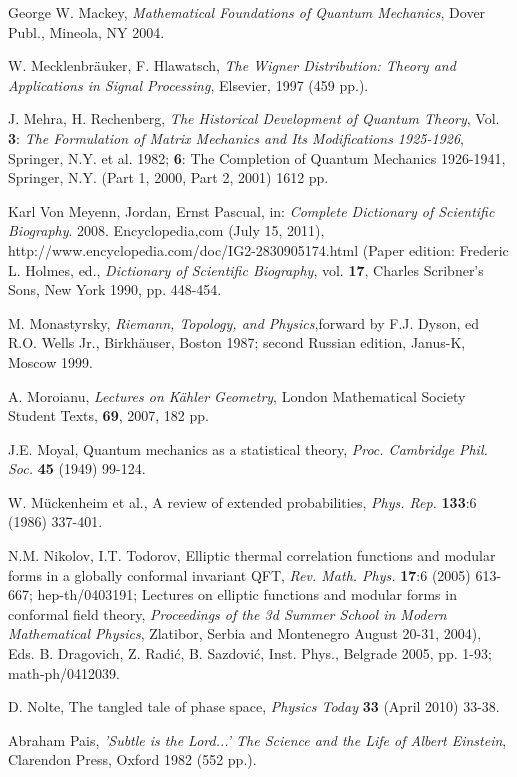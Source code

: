 \begin{thebibliography}{000}
 George W. Mackey, {\it Mathematical Foundations of Quantum Mechanics},
Dover Publ., Mineola, NY 2004.

 W. Mecklenbr\"auker, F. Hlawatsch, {\it The Wigner Distribution: Theory 
 and Applications in Signal Processing}, Elsevier, 1997 (459 pp.).	

 J. Mehra, H. Rechenberg, {\it The Historical Development of
Quantum Theory}, Vol. {\bf 3}: {\it The Formulation of Matrix Mechanics and Its
Modifications 1925-1926}, Springer, N.Y. et al. 1982; {\bf 6}: The Completion of
Quantum Mechanics 1926-1941, Springer, N.Y. (Part 1, 2000, Part 2, 2001) 
1612 pp.

 Karl Von Meyenn, Jordan, Ernst Pascual, in: {\it Complete
Dictionary of Scientific Biography}. 2008. Encyclopedia,com (July 15, 2011),
http://www.encyclopedia.com/doc/IG2-2830905174.html (Paper edition: Frederic L.
 Holmes, ed., {\it Dictionary of Scientific Biography}, vol. {\bf 17}, Charles
Scribner's Sons, New York 1990, pp. 448-454.

 M. Monastyrsky, {\it Riemann, Topology, and Physics},forward 
by F.J. Dyson, ed R.O. Wells Jr., Birkh\"auser, Boston 1987; second Russian 
edition, Janus-K, Moscow 1999.

 A. Moroianu, {\it Lectures on K\"ahler Geometry}, London
Mathematical Society Student Texts, {\bf 69}, 2007, 182 pp.

 J.E. Moyal, Quantum mechanics as a statistical theory,
{\it Proc. Cambridge Phil. Soc.} {\bf 45} (1949) 99-124.

 W. M\"uckenheim et al., A review of extended probabilities, 
{\it Phys. Rep.} {\bf 133}:6 (1986) 337-401.

 N.M. Nikolov, I.T. Todorov, Elliptic thermal correlation 
functions and modular forms in a globally conformal invariant QFT, {\it Rev. 
Math. Phys.} {\bf 17}:6 (2005) 613-667; hep-th/0403191; Lectures on elliptic 
functions and modular forms in conformal field theory, {\it Proceedings of the 
3d Summer  School in Modern Mathematical Physics}, Zlatibor, Serbia and 
Montenegro August 20-31, 2004), Eds. B. Dragovich, Z. Radi\'c, B. Sazdovi\'c, 
Inst. Phys., Belgrade 2005, pp. 1-93; math-ph/0412039.

 D. Nolte, The tangled tale of phase space, {\it Physics Today} 
{\bf 33} (April 2010) 33-38.

Abraham Pais, {\it 'Subtle is the Lord...' The Science and the
Life of Albert Einstein}, Clarendon Press, Oxford 1982 (552 pp.).


\end{thebibliography}
